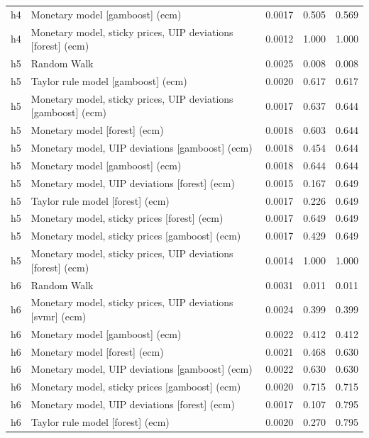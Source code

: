 \begin{ThreePartTable}
\begin{longtable}[t]{cp{5.5cm}ccc}
h4 & \raggedright Monetary model [gamboost] (ecm) & 0.0017 & 0.505 & 0.569\\
h4 & \raggedright Monetary model, sticky prices, UIP deviations [forest] (ecm) & 0.0012 & 1.000 & 1.000\\
\addlinespace
h5 & \raggedright Random Walk & 0.0025 & 0.008 & 0.008\\
h5 & \raggedright Taylor rule model [gamboost] (ecm) & 0.0020 & 0.617 & 0.617\\
h5 & \raggedright Monetary model, sticky prices, UIP deviations [gamboost] (ecm) & 0.0017 & 0.637 & 0.644\\
h5 & \raggedright Monetary model [forest] (ecm) & 0.0018 & 0.603 & 0.644\\
h5 & \raggedright Monetary model, UIP deviations [gamboost] (ecm) & 0.0018 & 0.454 & 0.644\\
h5 & \raggedright Monetary model [gamboost] (ecm) & 0.0018 & 0.644 & 0.644\\
h5 & \raggedright Monetary model, UIP deviations [forest] (ecm) & 0.0015 & 0.167 & 0.649\\
h5 & \raggedright Taylor rule model [forest] (ecm) & 0.0017 & 0.226 & 0.649\\
h5 & \raggedright Monetary model, sticky prices [forest] (ecm) & 0.0017 & 0.649 & 0.649\\
h5 & \raggedright Monetary model, sticky prices [gamboost] (ecm) & 0.0017 & 0.429 & 0.649\\
h5 & \raggedright Monetary model, sticky prices, UIP deviations [forest] (ecm) & 0.0014 & 1.000 & 1.000\\
\addlinespace
h6 & \raggedright Random Walk & 0.0031 & 0.011 & 0.011\\
h6 & \raggedright Monetary model, sticky prices, UIP deviations [svmr] (ecm) & 0.0024 & 0.399 & 0.399\\
h6 & \raggedright Monetary model [gamboost] (ecm) & 0.0022 & 0.412 & 0.412\\
h6 & \raggedright Monetary model [forest] (ecm) & 0.0021 & 0.468 & 0.630\\
h6 & \raggedright Monetary model, UIP deviations [gamboost] (ecm) & 0.0022 & 0.630 & 0.630\\
h6 & \raggedright Monetary model, sticky prices [gamboost] (ecm) & 0.0020 & 0.715 & 0.715\\
h6 & \raggedright Monetary model, UIP deviations [forest] (ecm) & 0.0017 & 0.107 & 0.795\\
h6 & \raggedright Taylor rule model [forest] (ecm) & 0.0020 & 0.270 & 0.795\\

\end{longtable}
\end{ThreePartTable}
